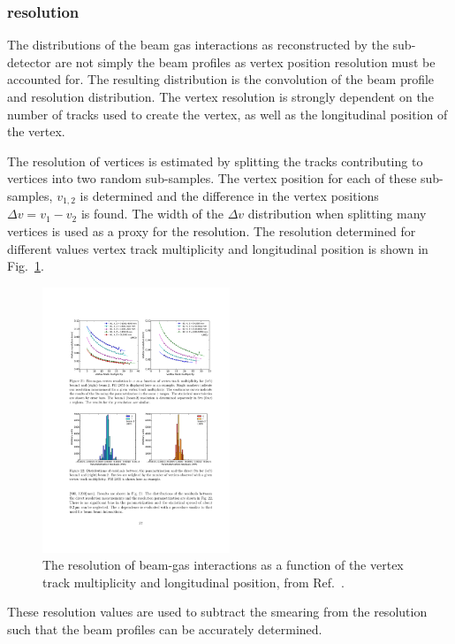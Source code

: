 \subsubsection{\velo resolution}

The distributions of the beam gas interactions as reconstructed by the \velo sub-detector are not simply the beam profiles as vertex position resolution must be accounted for. The resulting distribution is the convolution of the beam profile and resolution distribution. The \velo vertex resolution is strongly dependent on the number of tracks used to create the vertex, as well as the longitudinal position of the vertex. 

The resolution of vertices is estimated by splitting the tracks contributing to vertices into two random sub-samples. The vertex position for each of these sub-samples, $v_{1,2}$ is determined and the difference in the vertex positions $\Delta v = v_{1}-v_{2}$ is found. The width of the $\Delta v$ distribution when splitting many vertices is used as a proxy for the resolution. 
The resolution determined for different values vertex track multiplicity and longitudinal position is shown in Fig.~\ref{fig:Dec_bgi_res}.
\begin{figure}[!h]
    \centering
    \includegraphics[width=0.5\textwidth]{figs/Detector/lumi_bgi_track_z_res.pdf}
    \caption{The resolution of beam-gas interactions as a function of the vertex track multiplicity and longitudinal position, from Ref.~\cite{1748-0221-9-12-P12005}.}
    \label{fig:Dec_bgi_res}   
\end{figure}
These resolution values are used to subtract the smearing from the \velo resolution such that the beam profiles can be accurately determined. 


